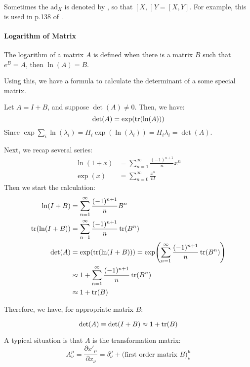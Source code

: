     Sometimes the $\mathrm{ad}_X$ is denoted by \nomen{$[X,\,\,]$}, so that
    $[X,\,] Y=[X,Y]$. For example, this is used in p.138 of \cite{Altland2010}.

    \paragraph{Logarithm of Matrix}
    The logarithm of  a matrix $A$ is defined when there is a matrix $B$ such that
    $e^B=A$, then $\ln(A)=B$.

    Using this, we have a formula to calculate the determinant of a some special
    matrix.

    Let $A = I + B$, and suppose $\det(A)\neq
    0$. Then, we have:
    \begin{equation}
        \det(A) = \exp(\tr(\ln(A)))
    \end{equation}
    Since $\exp{\sum_i \ln(\lambda_i)} = \Pi_i \exp(\ln(\lambda_i))=\Pi_i
    \lambda_i=\det(A)$.

    Next, we recap several series:
    \begin{align*}
        \ln(1+x) &= \sum_{n=1}^{\infty} \frac{(-1)^{n+1}}{n}x^n \\
        \exp(x) &= \sum_{n=0}^{\infty} \frac{x^n}{n!}
    \end{align*}
    Then we start the calculation:
    \begin{align*}
        \ln(I+B) &= \sum_{n=1}^{\infty} \frac{(-1)^{n+1}}{n}B^n \\
        \tr(\ln(I+B)) &= \sum_{n=1}^{\infty} \frac{(-1)^{n+1}}{n}\tr(B^n) \\
        \det(A) &= \exp(\tr(\ln(I+B))) 
            = \exp(\sum_{n=1}^{\infty} \frac{(-1)^{n+1}}{n}\tr(B^n)) \\
            &\approx 1+ \sum_{n=1}^{\infty} \frac{(-1)^{n+1}}{n}\tr(B^n) \\
            &\approx 1+ \tr(B)
    \end{align*}

    Therefore, we have, for appropriate matrix $B$:
    \begin{thm}
    \begin{equation}
        \det(A) \equiv \det(I+B) \approx 1+\tr(B)
    \end{equation}
    \end{thm}
    
    A typical situation is that $A$ is the transformation matrix:
    \begin{equation}
        A^\mu_\nu = \frac{\partial x'_\mu}{\partial x_\nu} 
        = \delta^\mu_\nu + \text{(first order matrix $B$)}^\mu_\nu
    \end{equation}
